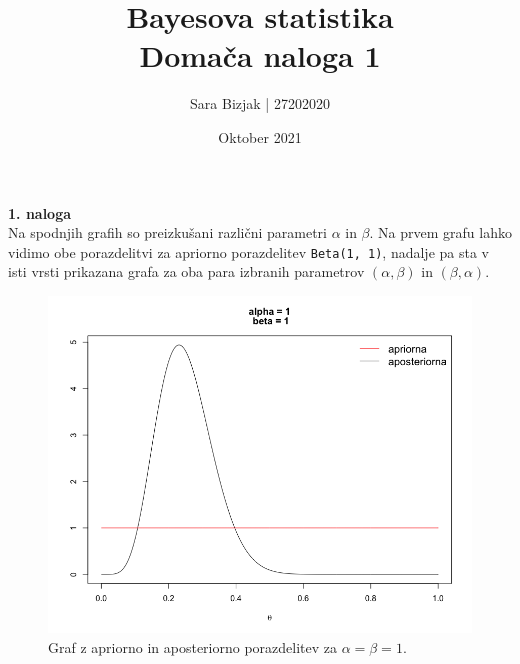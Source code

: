 \documentclass[a4paper,11pt]{article}
\title{Bayesova statistika \\
\textbf{Domača naloga 1} }
\author{Sara Bizjak  |  27202020}
\date{Oktober 2021}
\begin{document}
\maketitle

\noindent
\textbf{1. naloga}
\\
Na spodnjih grafih so preizkušani različni parametri $\alpha$ in $\beta$. 
Na prvem grafu lahko vidimo obe porazdelitvi za apriorno porazdelitev \texttt{Beta(1, 1)}, 
nadalje pa sta v isti vrsti prikazana grafa za oba para izbranih parametrov $(\alpha, \beta)$ in $(\beta, \alpha)$.


\begin{figure}[ht!]
    \centering
    \includegraphics[width = 120mm]{Slike/1_3.png}
    \caption{Graf z apriorno in aposteriorno porazdelitev za $\alpha = \beta = 1$.}
\end{figure}
\end{document}
